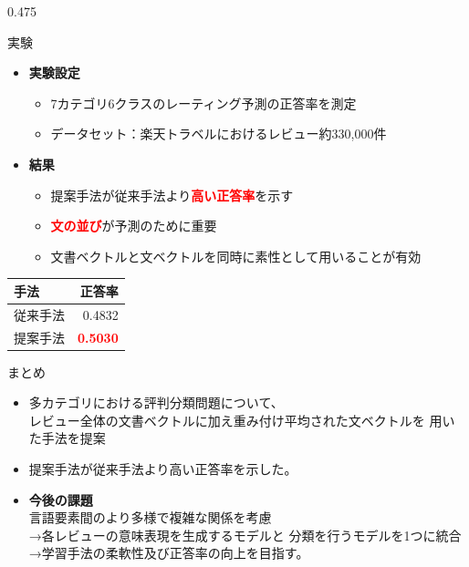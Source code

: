 \documentclass[unicode,10pt]{beamer}
\newcommand{\arrow}{\textcolor{ttiblue}{→}\hspace{1ex}}
\newcommand{\itemtitle}[1]{\textbf{#1}\\}
\newcommand{\fire}[1]{\textcolor{red}{\textbf{#1}}}
\newcommand{\columnsize}{0.475\textwidth}
\begin{document}
\begin{frame}
\begin{columns}[onlytextwidth,t]
\begin{column}{\columnsize}
  \begin{block}{実験}
    \begin{itemize}
      \item \itemtitle{実験設定}
        \begin{itemize}
          \item 7カテゴリ6クラスのレーティング予測の正答率を測定
          \item データセット：楽天トラベルにおけるレビュー約330,000件
        \end{itemize}
      \item \itemtitle{結果}
        \begin{itemize}
          \item 提案手法が従来手法より\fire{高い正答率}を示す
          \item \fire{文の並び}が予測のために重要
          \item 文書ベクトルと文ベクトルを同時に素性として用いることが有効
        \end{itemize}
    \end{itemize}
    \begin{table}
      \centering
      \begin{tabular}{l | r}
        手法 & 正答率 \\
        \hline
        従来手法 & 0.4832 \\
        提案手法 & \fire{0.5030} \\
      \end{tabular}
    \end{table}
  \end{block}

  \begin{block}{まとめ}
    \begin{itemize}
      \item 多カテゴリにおける評判分類問題について、\\
            レビュー全体の文書ベクトルに加え重み付け平均された文ベクトルを
            用いた手法を提案
      \item 提案手法が従来手法\cite{fujitani15}より高い正答率を示した。
      \item \itemtitle{今後の課題}
            言語要素間のより多様で複雑な関係を考慮 \\
            \arrow 各レビューの意味表現を生成するモデルと
                   分類を行うモデルを1つに統合 \\
            \arrow 学習手法の柔軟性及び正答率の向上を目指す。
    \end{itemize}
  \end{block}


\end{column}
\end{columns}
\end{frame}
\end{document}
